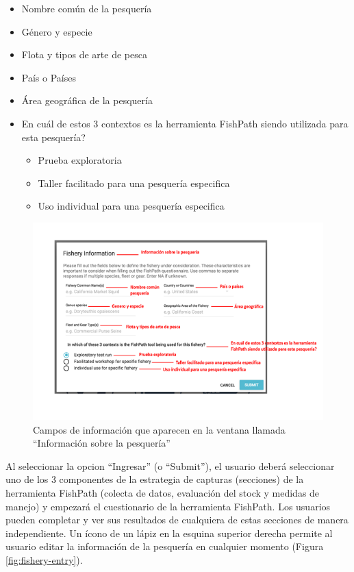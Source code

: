 \documentclass[
  11pt,
]{book}
\providecommand{\tightlist}{%
  \setlength{\itemsep}{0pt}\setlength{\parskip}{0pt}}
\begin{document}
\begin{itemize}
\tightlist
\item
  Nombre común de la pesquería
\item
  Género y especie
\item
  Flota y tipos de arte de pesca
\item
  País o Países
\item
  Área geográfica de la pesquería
\item
  En cuál de estos 3 contextos es la herramienta FishPath siendo utilizada para esta pesquería?

  \begin{itemize}
  \tightlist
  \item
    Prueba exploratoria\\
  \item
    Taller facilitado para una pesquería especifica
  \item
    Uso individual para una pesquería especifica
  \end{itemize}
\end{itemize}

\begin{figure}

{\centering \includegraphics[width=0.95\linewidth]{images/fishery-info-screen-es} 

}

\caption{Campos de información que aparecen en la ventana llamada “Información sobre la pesquería”}\label{fig:fishery-info}
\end{figure}

Al seleccionar la opcion ``Ingresar'' (o ``Submit''), el usuario deberá seleccionar uno de los 3 componentes de la estrategia de capturas (secciones) de la herramienta FishPath (colecta de datos, evaluación del stock y medidas de manejo) y empezará el cuestionario de la herramienta FishPath. Los usuarios pueden completar y ver sus resultados de cualquiera de estas secciones de manera independiente. Un ícono de un lápiz en la esquina superior derecha permite al usuario editar la información de la pesquería en cualquier momento (Figura \ref{fig:fishery-entry}).
\end{document}
